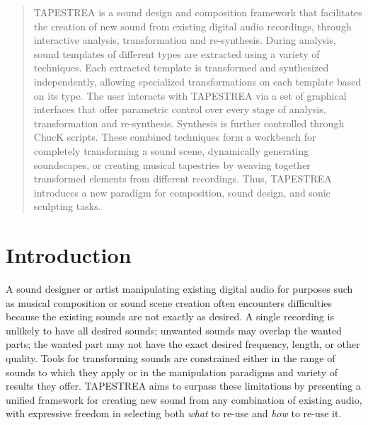 \documentclass{sig-alt-release2}
\begin{document}
\maketitle
\begin{abstract}

TAPESTREA is a sound design and composition framework that facilitates the creation 
of new sound from existing digital audio recordings, through interactive analysis, 
transformation and re-synthesis. During analysis, sound templates of different types are 
extracted using a variety of techniques. Each extracted template is transformed and 
synthesized independently, allowing specialized transformations on each template based 
on its type. The user interacts with TAPESTREA 
via a set of graphical interfaces that offer parametric control over every stage of analysis, 
transformation and re-synthesis. Synthesis is further controlled through ChucK scripts. 
These combined techniques form a workbench for completely transforming a sound 
scene, dynamically generating soundscapes, or creating musical tapestries by weaving 
together transformed elements from different recordings. Thus, TAPESTREA introduces 
a new paradigm for composition, sound design, and sonic sculpting tasks.
\end{abstract}




\section{Introduction}

A sound designer or artist manipulating existing digital audio for purposes such as musical composition or sound scene creation often encounters difficulties because the existing sounds are not exactly as desired. A single recording is unlikely to have all desired sounds; unwanted sounds may overlap the wanted parts; the wanted part may not have the exact desired frequency, length, or other quality. Tools for transforming sounds are constrained either in the range of sounds to which they apply or in the manipulation paradigms and variety of results they offer. TAPESTREA aims to surpass these limitations by presenting a unified framework for creating new sound from any combination of existing audio, with expressive freedom in selecting both \textit{what} to re-use and \textit{how} to re-use it. 
\end{document}
